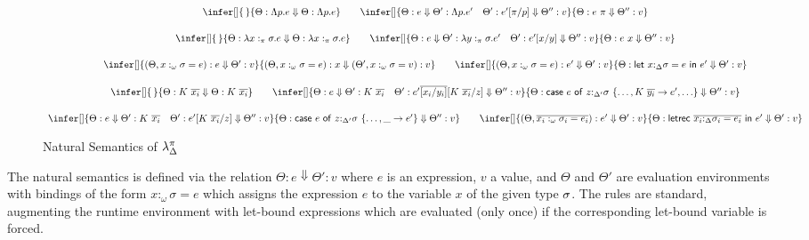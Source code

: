\documentclass[acmsmall,review,anonymous,screen]{acmart}
\newcommand{\llet}[2]{\mathsf{let}~#1~\mathsf{in}~#2}
\newcommand{\lletrec}[2]{\mathsf{letrec}~#1~\mathsf{in}~#2}
\newcommand{\ccase}[2]{\mathsf{case}~#1~\mathsf{of}~#2}
\begin{document}
\begin{figure}

  {\small
    \[
  \begin{array}{c}
    \infer[]
    {\,}
    {\Theta : \Lambda p.e \Downarrow \Theta : \Lambda p.e}
    \qquad
    \infer[]
    {\Theta : e\Downarrow \Theta' : \Lambda p.e' \quad \Theta' :
    e'[\pi/p]\Downarrow \Theta'' : v}
    {\Theta : e~\pi\Downarrow \Theta'' : v }\\[1.5em]
    \infer[]
    {\,}
    {\Theta : \lambda x:_\pi \sigma . e \Downarrow \Theta : \lambda x:_\pi \sigma . e }
    \qquad
    \infer[]
    {\Theta : e \Downarrow \Theta' : \lambda y:_\pi \sigma . e' \quad
    \Theta' : e'[x/y] \Downarrow \Theta'' : v }
    {\Theta : e~x \Downarrow \Theta'' : v}\\[1.5em]
    \infer[]
    {(\Theta,  x:_\omega \sigma = e) : e \Downarrow \Theta' : v}
    {(\Theta , x:_\omega \sigma = e) : x \Downarrow (\Theta',x:_\omega
    \sigma = v) : v}
    \qquad
    \infer[]
    {(\Theta,x:_\omega \sigma = e) : e' \Downarrow \Theta' : v}
    {\Theta : \llet{x{:}_{\Delta}\sigma = e}{e'}\Downarrow \Theta' : v
    }\\[1.5em]
    \infer[]
    {\,}
    {\Theta : K~\ov{x_i} \Downarrow \Theta : K~\ov{x_i}}
    \qquad
    \infer[]
    {\Theta : e \Downarrow \Theta' : K~\ov{x_i} \quad
    \Theta' : e'\ov{[x_i/y_i]}[K~\ov{x_i}/z] \Downarrow \Theta'' : v }
    {\Theta :
    \ccase{e}{z{:}_{\Delta'}\sigma~\{{\dots,K~\ov{y_i} \to e', {\dots}}\}}
    \Downarrow \Theta'' : v}\\[1.5em]
    \infer[]
    {\Theta : e \Downarrow \Theta' : K~\ov{x_i} \quad
    \Theta' : e'[K~\ov{x_i}/z] \Downarrow \Theta'' : v }
    {\Theta :
    \ccase{e}{z{:}_{\Delta'}\sigma~\{\dots , \_\to
    e'}\} \Downarrow \Theta'' : v}
    \qquad
    \infer[]
    {%
    (\Theta, \overline{x_i:_\omega \sigma_i = e_i}) : e' \Downarrow \Theta'
    : v
    }
    {\Theta : \lletrec{\overline{x_i{:}_{\Delta}\sigma_i = e_i}}{e'}
    \Downarrow \Theta' : v}
    \end{array}
\]}
    \caption{Natural Semantics of $\lambda^\pi_\Delta$\label{fig:opsem}}
  \end{figure}

  The natural semantics is defined via the relation
$\Theta : e \Downarrow \Theta' : v$ where $e$ is an expression, $v$ a
value, and $\Theta$ and $\Theta'$ are evaluation environments with bindings of
the form $x:_\omega\sigma = e$ which assigns the expression $e$ to the variable
$x$ of the given type $\sigma$. The rules are standard, augmenting the runtime
environment with let-bound expressions which are evaluated (only once) if the
corresponding let-bound variable is forced.
\end{document}
